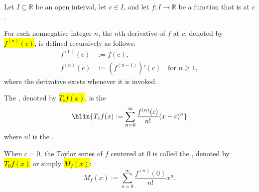 \begin{definition} \label{definition:taylor_and_maclaurin_series_of_a_real_valued_function}
    Let $I \subseteq \mathbb{R}$ be an open interval, let $c \in I$, and let $f : I \to \mathbb{R}$ be a function that is  at $c$. 

    For each nonnegative integer $n$, the $n$th derivative of $f$ at $c$, denoted by \hl{$f^{(n)}(c)$}, is defined recursively as follows:
    \begin{align*}
        f^{(0)}(c) &:= f(c), \\
        f^{(n)}(c) &:= \left(f^{(n-1)}\right)'(c) \quad\text{for } n \geq 1,
    \end{align*}
    where the derivative exists whenever it is invoked.

    The , denoted by \hl{$T_c f(x)$}, is the 
    $$\hlin{T_c f(x) := \sum_{n=0}^\infty \frac{f^{(n)}(c)}{n!} (x - c)^n}$$
    where $n!$ is the .

    When $c = 0$, the Taylor series of $f$ centered at $0$ is called the , denoted by \hl{$T_0 f(x)$} or simply \hl{$M_f(x)$}:
    $$M_f(x) := \sum_{n=0}^\infty \frac{f^{(n)}(0)}{n!} x^n.$$
\end{definition}
